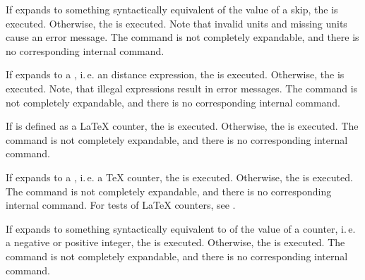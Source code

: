 \begin{Declaration}
\end{Declaration}
If
 expands to something syntactically equivalent of the value
of a skip, the  is executed. Otherwise, the 
is executed.  Note that invalid units and missing units
cause an error message.  The command is not completely expandable, and
there is no corresponding internal command.%
\EndIndexGroup


\begin{Declaration}
\end{Declaration}
If
 expands to a , i.\,e. an \eTeX{} distance
expression, the  is executed. Otherwise, the  is executed.  Note, that illegal expressions
result in error messages. The command is not completely expandable, and
there is no corresponding internal command.%
\EndIndexGroup


\begin{Declaration}
\end{Declaration}
If
 is defined as a \LaTeX{} counter, the  is
executed. Otherwise, the  is executed. The command is
not completely expandable, and there is no corresponding internal command.%
\EndIndexGroup


\begin{Declaration}
\end{Declaration}
If
 expands to a , i.\,e. a \TeX{} counter, the
 is executed. Otherwise, the  is
executed. The command is not completely expandable, and there is no
corresponding internal command. For tests of \LaTeX{} counters, see
.%
\EndIndexGroup


\begin{Declaration}
\end{Declaration}
If
 expands to something syntactically equivalent to of the
value of a counter, i.\,e. a negative or positive integer, the  is executed. Otherwise, the  is
executed. The command is not completely expandable, and there is no
corresponding internal command.%
\EndIndexGroup


